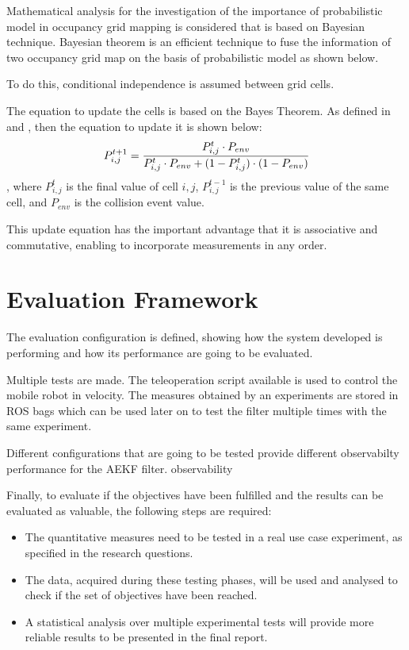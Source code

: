 Mathematical analysis for the investigation of the importance of probabilistic model in occupancy grid mapping is considered that is based on Bayesian technique. Bayesian theorem is an efficient technique to fuse the information of two occupancy grid map on the basis of probabilistic model as shown below.

To do this, conditional independence is assumed between grid cells.


The equation to update the cells is based on the Bayes Theorem.
As defined in \cite{joubert2012adaptive} and \cite{singh_sonar_2019}, then the equation to update it is shown below:
\begin{equation}
    P_{i,j}^{t+1} = \cfrac{P_{i,j}^{t} \cdot P_{env}}{P_{i,j}^{t} \cdot P_{env} + (1-P_{i,j}^{t}) \cdot (1-P_{env})}
\end{equation}
, where $P_{i,j}^{t}$ is the final value of cell $i,j$, $P_{i,j}^{t-1}$ is the previous value of the same cell, and $P_{env}$ is the collision event value.

This update equation has the important advantage that it is associative and commutative, enabling to incorporate measurements in any order.

\section{Evaluation Framework}

\label{sec:testing}

\noindent 
The evaluation configuration is defined, showing how the system developed is performing and how its performance are going to be evaluated.

Multiple tests are made.
The teleoperation script available is used to control the mobile robot in velocity.
The measures obtained by an experiments are stored in \gls{ROS} bags which can be used later on to test the filter multiple times with the same experiment.

Different configurations that are going to be tested provide different observabilty performance for the AEKF filter.
observability



Finally, to evaluate if the objectives have been fulfilled and the results can be evaluated as valuable, the following steps are required:
\begin{itemize}
	\item The quantitative measures need to be tested in a real use case experiment, as specified in the research questions.
	\item The data, acquired during these testing phases, will be used and analysed to check if the set of objectives have been reached.
	\item A statistical analysis over multiple experimental tests will provide more reliable results to be presented in the final report.
\end{itemize}


